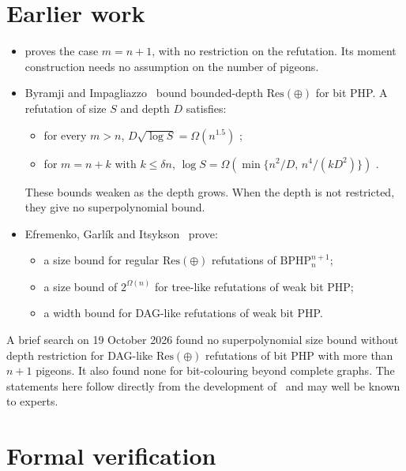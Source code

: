 \documentclass[11pt]{article}
\theoremstyle{remark}
\newcommand{\Res}{\mathrm{Res}(\oplus)}
\newcommand{\BPHP}{\mathrm{BPHP}}
\begin{document}
\section{Earlier work}

\begin{itemize}
\item \cite{Br26} proves the case $m=n+1$, with no restriction on the
refutation. Its moment construction needs no assumption on the number of
pigeons.
\item Byramji and Impagliazzo~\cite{BI25} bound bounded-depth $\Res$ for bit
PHP. A refutation of size $S$ and depth $D$ satisfies:
\begin{itemize}
\item for every $m>n$, $D\sqrt{\log S}=\Omega(n^{1.5})$ \cite[Theorem~1.1]{BI25};
\item for $m=n+k$ with $k\le\delta n$,
$\log S=\Omega(\min\{n^2/D,\,n^4/(kD^2)\})$ \cite[Theorem~1.3]{BI25}.
\end{itemize}
These bounds weaken as the depth grows. When the depth is not restricted, they
give no superpolynomial bound.
\item Efremenko, Garl\'ik and Itsykson~\cite{EGI} prove:
\begin{itemize}
\item a size bound for regular $\Res$ refutations of $\BPHP^{n+1}_n$;
\item a size bound of $2^{\Omega(n)}$ for tree-like refutations of weak bit
PHP;
\item a width bound for DAG-like refutations of weak bit PHP.
\end{itemize}
\end{itemize}
A brief search on 19 October 2026 found no superpolynomial size bound without
depth restriction for DAG-like $\Res$ refutations of bit PHP with more than
$n+1$ pigeons. It also found none for bit-colouring beyond complete graphs. The
statements here follow directly from the development of~\cite{Br26} and may
well be known to experts.

\section{Formal verification}
\begingroup\raggedright
\end{document}
